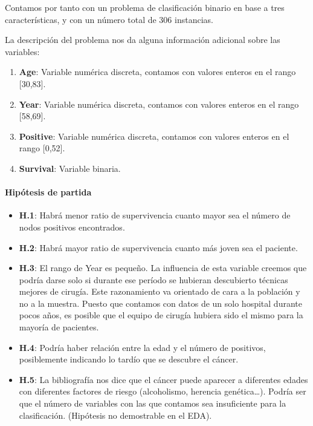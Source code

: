 
Contamos por tanto con un problema de clasificación binario en base a tres características, y con un número total de 306 instancias.

\vspace{\baselineskip}

La descripción del problema nos da alguna información adicional sobre las variables:

\begin{enumerate}
    \def\labelenumi{\arabic{enumi}.}
    \item \textbf{Age}: Variable numérica discreta, contamos con valores enteros en el
    rango {[}30,83{]}.
    \item \textbf{Year}: Variable numérica discreta, contamos con valores enteros en el
    rango {[}58,69{]}.
    \item \textbf{Positive}: Variable numérica discreta, contamos con valores enteros en
    el rango {[}0,52{]}.
    \item \textbf{Survival}: Variable binaria.
\end{enumerate}

\paragraph{Hipótesis de partida}

\begin{itemize}
    \item \textbf{H.1}: Habrá menor ratio de supervivencia cuanto mayor sea el número de nodos positivos encontrados.
    \item \textbf{H.2}: Habrá mayor ratio de supervivencia cuanto más joven sea el paciente.
    \item \textbf{H.3}: El rango de Year es pequeño. La influencia de esta variable creemos que podría darse solo si durante ese período se hubieran descubierto técnicas mejores de cirugía. Este razonamiento va orientado de cara a la población y no a la muestra. Puesto que contamos con datos de un solo hospital durante pocos años, es posible que el equipo de cirugía hubiera sido el mismo para la mayoría de pacientes.
    \item \textbf{H.4}: Podría haber relación entre la edad y el número de positivos, posiblemente indicando lo tardío que se descubre el cáncer.
    \item \textbf{H.5}: La bibliografía nos dice que el cáncer puede aparecer a diferentes edades con diferentes factores de riesgo (alcoholismo, herencia genética\ldots). Podría ser que el número de variables con las que contamos sea insuficiente para la clasificación. (Hipótesis no demostrable en el EDA).
\end{itemize}

